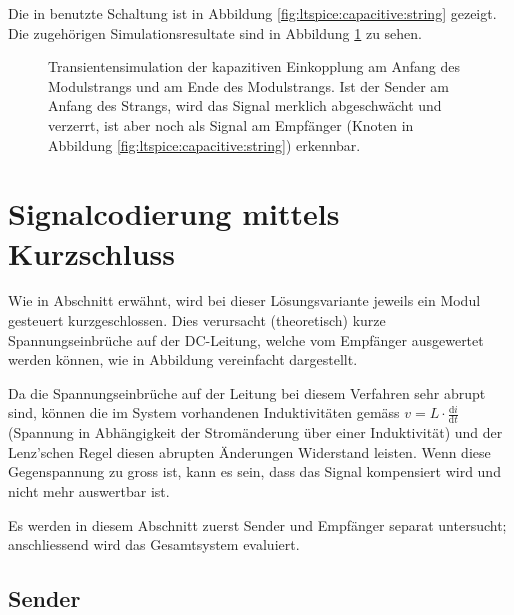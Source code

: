 Die    in        benutzte    Schaltung    ist    in    Abbildung
\ref{fig:ltspice:capacitive:string}      gezeigt.       Die      zugeh\"origen
Simulationsresultate   sind    in   Abbildung   \ref{fig:simu:capacitive:tran}
zu sehen.%

\begin{figure}[h!tb]
    
    \caption{%
        Transientensimulation  der  kapazitiven   Einkopplung  am  Anfang  des
        Modulstrangs und  am Ende des  Modulstrangs. Ist der Sender  am Anfang
        des Strangs, wird das Signal merklich abgeschw\"acht und verzerrt, ist
        aber  noch  als  Signal  am  Empf\"anger  (Knoten    in
        Abbildung \ref{fig:ltspice:capacitive:string}) erkennbar.%
    }
    \label{fig:simu:capacitive:tran}
\end{figure}


\clearpage
\section{Signalcodierung mittels Kurzschluss}
\label{sec:simu:short}

Wie in Abschnitt  erw\"ahnt, wird bei dieser L\"osungsvariante
jeweils  ein Modul  gesteuert  kurzgeschlossen. Dies verursacht  (theoretisch)
kurze  Spannungseinbr\"uche   auf  der  DC-Leitung,  welche   vom  Empf\"anger
ausgewertet  werden  k\"onnen,  wie in  Abbildung  vereinfacht
dargestellt.

Da die Spannungseinbr\"uche  auf der Leitung bei diesem  Verfahren sehr abrupt
sind,  k\"onnen  die im  System  vorhandenen  Induktivit\"aten gem\"ass  $v  =
L  \cdot  \frac{\mathrm{d}i}{\mathrm{d}t}$  (Spannung  in  Abh\"angigkeit  der
Strom\"anderung \"uber  einer Induktivit\"at) und der  Lenz'schen Regel diesen
abrupten \"Anderungen  Widerstand leisten. Wenn  diese Gegenspannung  zu gross
ist, kann es sein, dass das  Signal kompensiert wird und nicht mehr auswertbar
ist.

Es  werden  in   diesem  Abschnitt  zuerst  Sender   und  Empf\"anger  separat
untersucht; anschliessend wird das Gesamtsystem evaluiert.


\subsection{Sender}
\label{subsec:simu:ask:sensor}

